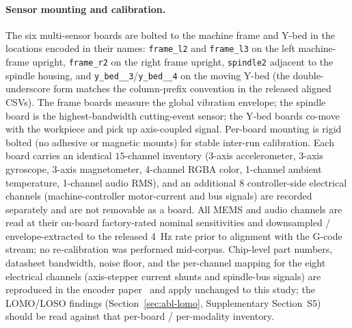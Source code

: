 \documentclass[11pt,a4paper]{article}
\begin{document}
\paragraph{Sensor mounting and calibration.} The six multi-sensor boards are bolted to the machine frame and Y-bed in the locations encoded in their names: \texttt{frame\_l2} and \texttt{frame\_l3} on the left machine-frame upright, \texttt{frame\_r2} on the right frame upright, \texttt{spindle2} adjacent to the spindle housing, and \texttt{y\_bed\_\_3}/\texttt{y\_bed\_\_4} on the moving Y-bed (the double-underscore form matches the column-prefix convention in the released aligned CSVs). The frame boards measure the global vibration envelope; the spindle board is the highest-bandwidth cutting-event sensor; the Y-bed boards co-move with the workpiece and pick up axis-coupled signal. Per-board mounting is rigid bolted (no adhesive or magnetic mounts) for stable inter-run calibration. Each board carries an identical $15$-channel inventory (3-axis accelerometer, 3-axis gyroscope, 3-axis magnetometer, 4-channel RGBA color, 1-channel ambient temperature, 1-channel audio RMS), and an additional 8 controller-side electrical channels (machine-controller motor-current and bus signals) are recorded separately and are not removable as a board. All MEMS and audio channels are read at their on-board factory-rated nominal sensitivities and downsampled / envelope-extracted to the released 4~Hz rate prior to alignment with the G-code stream; no re-calibration was performed mid-corpus. Chip-level part numbers, datasheet bandwidth, noise floor, and the per-channel mapping for the eight electrical channels (axis-stepper current shunts and spindle-bus signals) are reproduced in the encoder paper~\cite{encoder_paper} and apply unchanged to this study; the LOMO/LOSO findings (Section~\ref{sec:abl-lomo}, Supplementary Section~S5) should be read against that per-board / per-modality inventory.
\end{document}

